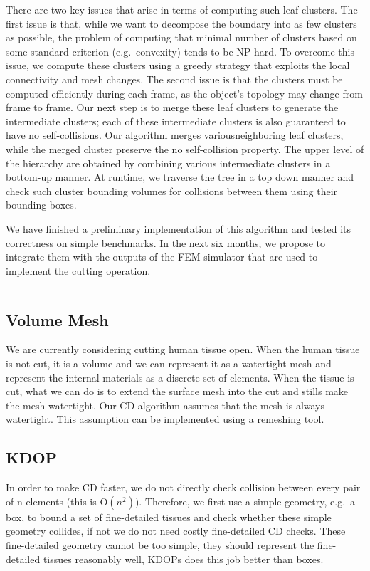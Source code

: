 There are two key issues that arise in terms of computing such leaf clusters. The first issue is that, while we want to decompose the boundary into as few clusters as possible, the problem of computing that minimal number of clusters based on some standard criterion (e.g.\ convexity) tends to be NP-hard. To overcome this issue, we compute these clusters using a greedy strategy that exploits the local connectivity and mesh changes. The second issue is that the clusters must be computed efficiently during each frame, as the object’s topology may change from frame to frame. Our next step is to merge these leaf clusters to generate the intermediate clusters; each of these intermediate clusters is also guaranteed to have no self-collisions. Our algorithm merges variousneighboring leaf clusters, while the merged cluster preserve the no self-collision property. The upper level of the hierarchy are obtained by combining various intermediate clusters in a bottom-up manner. At runtime, we traverse the tree in a top down manner and check such cluster bounding volumes for collisions between them using their bounding boxes.

We have finished a preliminary implementation of this algorithm and tested its correctness on simple benchmarks. In the next six months, we propose to integrate them with the outputs of the FEM simulator that are used to implement the cutting operation.

\hrule%

\subsection{Volume Mesh}\label{ssec:volume_mesh}
We are currently considering cutting human tissue open. When the human tissue is not cut, it is a volume and we can represent it as a watertight mesh and represent the internal materials as a discrete set of elements. When the tissue is cut, what we can do is to extend the surface mesh into the cut and stills make the mesh watertight. Our CD algorithm assumes that the mesh is always watertight. This assumption can be implemented using a remeshing tool.

\subsection{KDOP}\label{ssec:kdop}
In order to make CD faster, we do not directly check collision between every pair of n elements (this is $\mathrm{O}(n^2)$).  Therefore, we first use a simple geometry, e.g.\ a box, to bound a set of fine-detailed tissues and check whether these simple geometry collides, if not we do not need costly fine-detailed CD checks. These fine-detailed geometry cannot be too simple, they should represent the fine-detailed tissues reasonably well, KDOPs does this job better than boxes.

